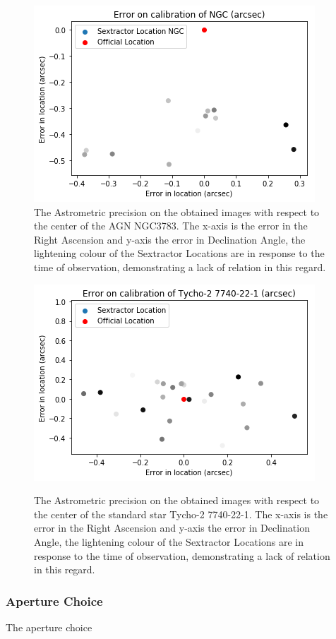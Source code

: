 \documentclass[a4paper, 12pt, twoside]{article}
\begin{document}
\begin{figure}[htp!]
\centering
\includegraphics[width=0.7\linewidth]{Figure/Astrometry_NGC3783.png}\\
\caption{The Astrometric precision on the obtained images with respect to the center of the AGN NGC3783. The x-axis is the error in the Right Ascension and y-axis the error in Declination Angle, the lightening colour of the Sextractor Locations are in response to the time of observation, demonstrating a lack of relation in this regard.}
\label{fig:Astrometry_NGC7213}

\centering
\includegraphics[width=0.7\linewidth]{Figure/Astrometry_Tycho-22-1.png}\\
\caption{The Astrometric precision on the obtained images with respect to the center of the standard star Tycho-2 7740-22-1. The x-axis is the error in the Right Ascension and y-axis the error in Declination Angle, the lightening colour of the Sextractor Locations are in response to the time of observation, demonstrating a lack of relation in this regard.}
\label{fig:Astrometry_Tycho-22-1}
\end{figure}

\subsubsection{Aperture Choice}
The aperture choice 
\end{document}
